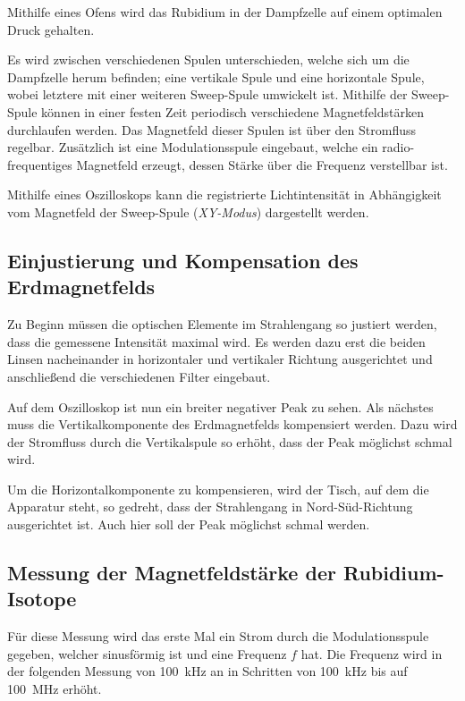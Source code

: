    Mithilfe eines Ofens wird das Rubidium in der Dampfzelle auf einem optimalen Druck gehalten.

    Es wird zwischen verschiedenen Spulen unterschieden,
    welche sich um die Dampfzelle herum befinden;
    eine vertikale Spule und eine horizontale Spule,
    wobei letztere mit einer weiteren Sweep-Spule umwickelt ist.
    Mithilfe der Sweep-Spule können in einer festen Zeit periodisch verschiedene Magnetfeldstärken durchlaufen werden.
    Das Magnetfeld dieser Spulen ist über den Stromfluss regelbar.
    Zusätzlich ist eine Modulationsspule eingebaut,
    welche ein radio-frequentiges Magnetfeld erzeugt,
    dessen Stärke über die Frequenz verstellbar ist.

    Mithilfe eines Oszilloskops kann die registrierte Lichtintensität
    in Abhängigkeit vom Magnetfeld der Sweep-Spule (\textit{XY-Modus})
    dargestellt werden.

\subsection{Einjustierung und Kompensation des Erdmagnetfelds}

    Zu Beginn müssen die optischen Elemente im Strahlengang so justiert werden,
    dass die gemessene Intensität maximal wird.
    Es werden dazu erst die beiden Linsen nacheinander in horizontaler und vertikaler Richtung ausgerichtet
    und anschließend die verschiedenen Filter eingebaut.

    Auf dem Oszilloskop ist nun ein breiter negativer Peak zu sehen.
    Als nächstes muss die Vertikalkomponente des Erdmagnetfelds kompensiert werden.
    Dazu wird der Stromfluss durch die Vertikalspule so erhöht,
    dass der Peak möglichst schmal wird.

    Um die Horizontalkomponente zu kompensieren,
    wird der Tisch, auf dem die Apparatur steht, so gedreht,
    dass der Strahlengang in Nord-Süd-Richtung ausgerichtet ist.
    Auch hier soll der Peak möglichst schmal werden.

\subsection{Messung der Magnetfeldstärke der Rubidium-Isotope}

    Für diese Messung wird das erste Mal ein Strom durch die Modulationsspule gegeben,
    welcher sinusförmig ist und eine Frequenz $f$ hat.
    Die Frequenz wird in der folgenden Messung von \SI{100}{\kilo\hertz} an in Schritten von \SI{100}{\kilo\hertz} bis auf \SI{100}{\mega\hertz} erhöht.

